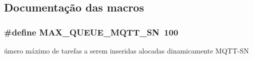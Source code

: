 \subsection{Documentação das macros}
\hypertarget{group__Macros_ga45ab5881e190d570f3784e50be2cce65}{
\subsubsection[{M\+A\+X\+\_\+\+Q\+U\+E\+U\+E\+\_\+\+M\+Q\+T\+T\+\_\+\+S\+N}]{\setlength{\rightskip}{0pt plus 5cm}\#define M\+A\+X\+\_\+\+Q\+U\+E\+U\+E\+\_\+\+M\+Q\+T\+T\+\_\+\+S\+N~100}}\label{group__Macros_ga45ab5881e190d570f3784e50be2cce65}
úmero máximo de tarefas a serem inseridas alocadas dinamicamente M\+Q\+T\+T-\/\+S\+N 